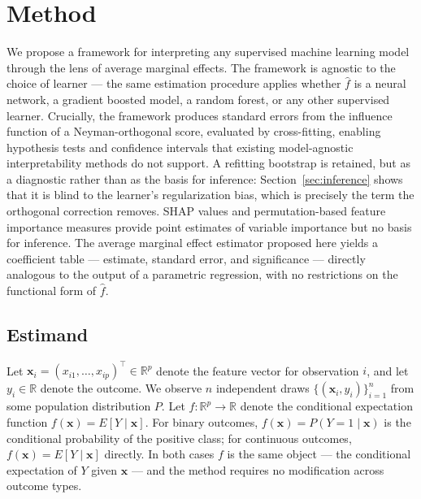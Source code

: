 \documentclass[12pt]{article}
\begin{document}
	\section{Method}
	
	We propose a framework for interpreting any supervised machine learning model through the lens of average marginal effects. The framework is agnostic to the choice of learner --- the same estimation procedure applies whether $\hat{f}$ is a neural network, a gradient boosted model, a random forest, or any other supervised learner. Crucially, the framework produces standard errors from the influence function of a Neyman-orthogonal score, evaluated by cross-fitting, enabling hypothesis tests and confidence intervals that existing model-agnostic interpretability methods do not support. A refitting bootstrap is retained, but as a diagnostic rather than as the basis for inference: Section~\ref{sec:inference} shows that it is blind to the learner's regularization bias, which is precisely the term the orthogonal correction removes. SHAP values and permutation-based feature importance measures provide point estimates of variable importance but no basis for inference. The average marginal effect estimator proposed here yields a coefficient table --- estimate, standard error, and significance --- directly analogous to the output of a parametric regression, with no restrictions on the functional form of $\hat{f}$.
	
	\subsection{Estimand}
	
	Let $\mathbf{x}_i = (x_{i1}, \dots, x_{ip})^\top \in \mathbb{R}^p$ denote the feature vector for observation $i$, and let $y_i \in \mathbb{R}$ denote the outcome. We observe $n$ independent draws $\{(\mathbf{x}_i, y_i)\}_{i=1}^n$ from some population distribution $P$. Let $f: \mathbb{R}^p \to \mathbb{R}$ denote the conditional expectation function $f(\mathbf{x}) = E[Y \mid \mathbf{x}]$. For binary outcomes, $f(\mathbf{x}) = P(Y = 1 \mid \mathbf{x})$ is the conditional probability of the positive class; for continuous outcomes, $f(\mathbf{x}) = E[Y \mid \mathbf{x}]$ directly. In both cases $f$ is the same object --- the conditional expectation of $Y$ given $\mathbf{x}$ --- and the method requires no modification across outcome types.
	
\end{document}
